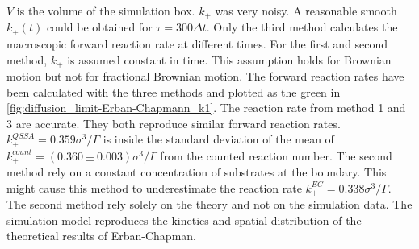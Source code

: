 \documentclass[
  a4paper,BCOR10mm,twoside,
  headsepline,footsepline,%
  fleqn,openbib
]{scrbook}
\begin{document}
$V$ is the volume of the simulation box. $k_+$ was very noisy. A reasonable smooth $k_+(t)$ could be obtained for $\tau=300 \Delta t$. Only the third method calculates the macroscopic forward reaction rate at different times. For the first and second method, $k_{+}$ is assumed constant in time. This assumption holds for Brownian motion but not for fractional Brownian motion. The forward reaction rates have been calculated with the three methods and plotted  as the green in \cref{fig:diffusion_limit-Erban-Chapmann_k1}. The reaction rate from method 1 and 3 are accurate. They both reproduce similar forward reaction rates. $k^{QSSA}_{+}=0.359 \sigma^3/\Gamma$ is inside the standard deviation of the mean of  $k^{count}_+=(0.360\pm0.003)\sigma^3/\Gamma$ from the counted reaction number. The second method rely on a constant concentration of substrates at the boundary. This might cause this method to underestimate the reaction rate $k^{EC}_{+}=0.338 \sigma^3/\Gamma$. The second method rely solely on the theory and not on the simulation data. The simulation model reproduces the kinetics and spatial distribution of the theoretical results of Erban-Chapman.
\end{document}
